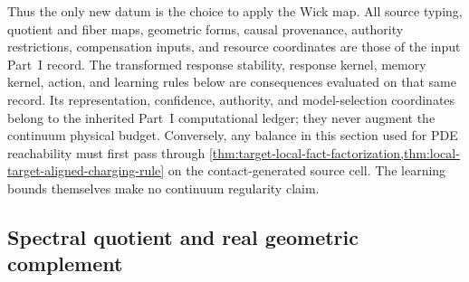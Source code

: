 \documentclass[11pt]{article}
\numberwithin{section}{part}
\theoremstyle{plain}
\theoremstyle{definition}
\theoremstyle{remark}
\begin{document}
Thus the only new datum is the choice to apply the Wick map.  All source
typing, quotient and fiber maps, geometric forms, causal provenance,
authority restrictions, compensation inputs, and resource coordinates are
those of the input Part~I record.  The transformed response stability,
response kernel, memory kernel, action, and learning rules below are
consequences evaluated on that same record.
Its representation, confidence, authority, and model-selection coordinates
belong to the inherited Part~I computational ledger; they never augment the
continuum physical budget.  Conversely, any balance in this section used for
PDE reachability must first pass through
\cref{thm:target-local-fact-factorization,thm:local-target-aligned-charging-rule}
on the contact-generated source cell.  The learning bounds themselves make
no continuum regularity claim.

\subsection{Spectral quotient and real geometric complement}
\label{subsec:wick-block-model}
\end{document}
